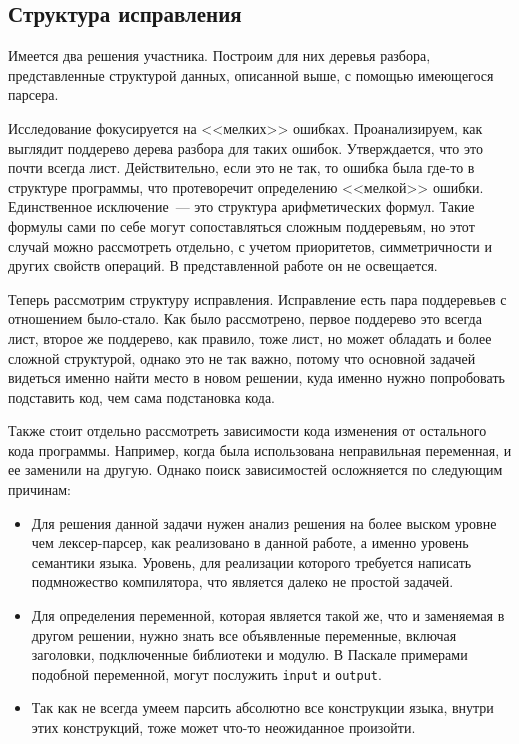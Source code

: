 \subsection{Структура исправления}

Имеется два решения участника. Построим для них деревья разбора, представленные структурой данных, описанной выше, 
с помощью имеющегося парсера. 

Исследование фокусируется на <<мелких>> ошибках. Проанализируем, как выглядит поддерево дерева разбора для таких ошибок.
Утверждается, что это почти всегда лист. Действительно, если это не так, то ошибка была где-то в структуре программы,
что протеворечит определению <<мелкой>> ошибки. Единственное исключение~--- это структура арифметических формул. Такие
формулы сами по себе могут сопоставляться сложным поддеревьям, но этот случай можно рассмотреть отдельно, с учетом
приоритетов, симметричности и других свойств операций. В представленной работе он не освещается.

Теперь рассмотрим структуру исправления. Исправление есть пара поддеревьев с отношением было-стало. Как было рассмотрено,
первое поддерево это всегда лист, второе же поддерево, как правило, тоже лист, но может обладать и более сложной структурой,
однако это не так важно, потому что основной задачей видеться именно найти место в новом решении, куда именно нужно попробовать 
подставить код, чем сама подстановка кода.   

Также стоит отдельно рассмотреть зависимости кода изменения от остального кода программы.
Например, когда была использована неправильная переменная, и ее заменили на другую. Однако поиск зависимостей 
осложняется по следующим причинам:
\begin{itemize}
    \item Для решения данной задачи нужен анализ решения на более выском уровне чем лексер-парсер, как реализовано
        в данной работе, а именно уровень семантики языка. Уровень, для реализации которого требуется написать
        подмножество компилятора, что является далеко не простой задачей.
    \item Для определения переменной, которая является такой же, что и заменяемая в другом решении, нужно знать
        все объявленные переменные, включая заголовки, подключенные библиотеки и модулю. В Паскале примерами подобной переменной,
        могут послужить \texttt{input} и \texttt{output}.
    \item Так как не всегда умеем парсить абсолютно все конструкции языка, внутри этих конструкций, тоже может что-то 
        неожиданное произойти.
\end{itemize}

